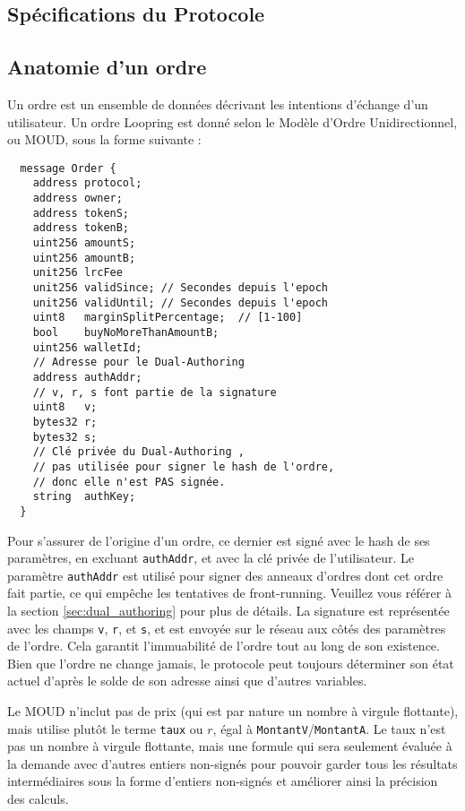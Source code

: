 \documentclass[UTF8,nofonts]{article}
\begin{document}
\begin{multicols}{2}
\section{Spécifications du Protocole\label{sec:protocol}}

\subsection{Anatomie d'un ordre\label{anatomy}}
Un ordre est un ensemble de données décrivant les intentions d'échange d'un utilisateur. Un ordre Loopring est donné selon le Modèle d'Ordre Unidirectionnel, ou MOUD, sous la forme suivante :

\begin{verbatim}
  message Order {
    address protocol;
    address owner;
    address tokenS;  
    address tokenB;
    uint256 amountS;
    uint256 amountB;
    unit256 lrcFee
    unit256 validSince; // Secondes depuis l'epoch
    unit256 validUntil; // Secondes depuis l'epoch
    uint8   marginSplitPercentage;  // [1-100]
    bool    buyNoMoreThanAmountB;
    uint256 walletId;
    // Adresse pour le Dual-Authoring 
    address authAddr;
   	// v, r, s font partie de la signature
    uint8   v;       
    bytes32 r;
    bytes32 s;
    // Clé privée du Dual-Authoring ,
    // pas utilisée pour signer le hash de l'ordre,
    // donc elle n'est PAS signée.
    string  authKey;          
  }
\end{verbatim}


Pour s'assurer de l'origine d'un ordre, ce dernier est signé avec le hash de ses paramètres, en excluant \verb|authAddr|, et avec la clé privée de l'utilisateur. Le paramètre \verb|authAddr| est utilisé pour signer des anneaux d'ordres dont cet ordre fait partie, ce qui empêche les tentatives de front-running. Veuillez vous référer à la section \ref{sec:dual_authoring} pour plus de détails. La signature est représentée avec les champs \verb|v|, \verb|r|, et \verb|s|, et est envoyée sur le réseau aux côtés des paramètres de l'ordre. Cela garantit l'immuabilité de l'ordre tout au long de son existence. Bien que l'ordre ne change jamais, le protocole peut toujours déterminer son état actuel d'après le solde de son adresse ainsi que d'autres variables.


Le MOUD n'inclut pas de prix (qui est par nature un nombre à virgule flottante), mais utilise plutôt le terme \verb|taux| ou $r$, égal à \verb|MontantV|/\verb|MontantA|. Le taux n'est pas un nombre à virgule flottante, mais une formule qui sera seulement évaluée à la demande avec d'autres entiers non-signés pour pouvoir garder tous les résultats intermédiaires sous la forme d'entiers non-signés et améliorer ainsi la précision des calculs. 


\end{multicols}
\end{document}
